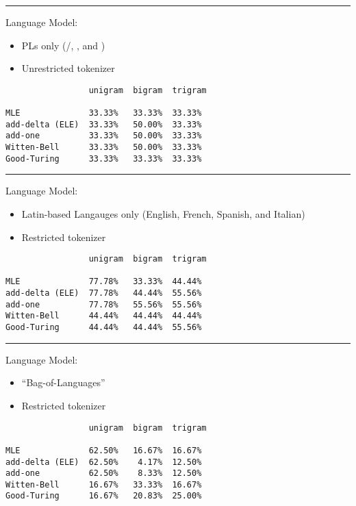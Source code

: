 \vspace{15pt}
\hrule
\vspace{15pt}

Language Model:

\begin{itemize}
\item PLs only ({\C}/{\cpp}, {\java}, and {\perl})
\item Unrestricted tokenizer
\end{itemize}

\begin{verbatim}
                 unigram  bigram  trigram

MLE              33.33%   33.33%  33.33%
add-delta (ELE)  33.33%   50.00%  33.33%
add-one          33.33%   50.00%  33.33%
Witten-Bell      33.33%   50.00%  33.33%
Good-Turing      33.33%   33.33%  33.33%
\end{verbatim}

\vspace{15pt}
\hrule
\vspace{15pt}

Language Model:

\begin{itemize}
\item Latin-based Langauges only (English, French, Spanish, and Italian)
\item Restricted tokenizer
\end{itemize}

\begin{verbatim}
                 unigram  bigram  trigram

MLE              77.78%   33.33%  44.44%
add-delta (ELE)  77.78%   44.44%  55.56%
add-one          77.78%   55.56%  55.56%
Witten-Bell      44.44%   44.44%  44.44%
Good-Turing      44.44%   44.44%  55.56%
\end{verbatim}

\vspace{15pt}
\hrule
\vspace{15pt}

Language Model:

\begin{itemize}
\item ``Bag-of-Languages''
\item Restricted tokenizer
\end{itemize}

\begin{verbatim}
                 unigram  bigram  trigram

MLE              62.50%   16.67%  16.67%
add-delta (ELE)  62.50%    4.17%  12.50%
add-one          62.50%    8.33%  12.50%
Witten-Bell      16.67%   33.33%  16.67%
Good-Turing      16.67%   20.83%  25.00%
\end{verbatim}


